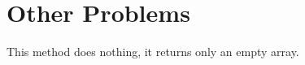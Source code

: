 \documentclass[../../dd.tex]{subfiles}
\begin{document}
	\chapter{Other Problems}

	

	This method does nothing, it returns only an empty array.
\end{document}
